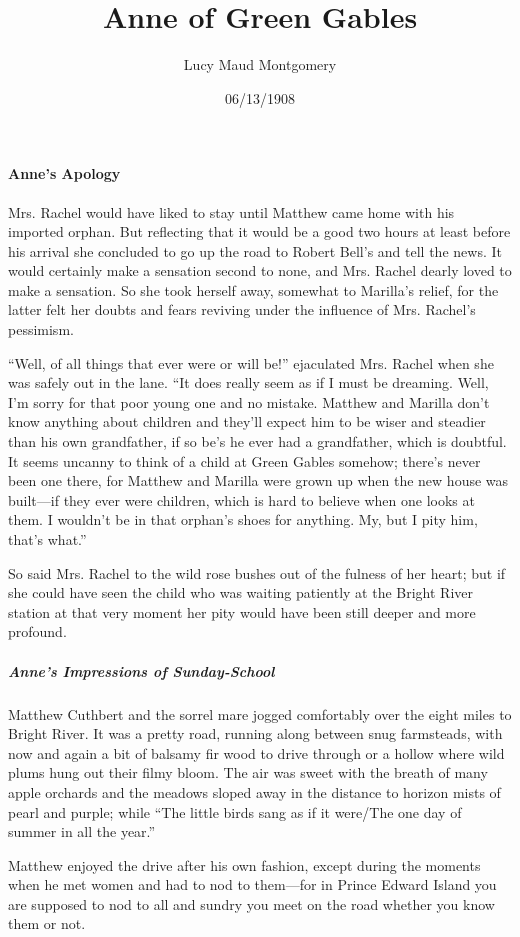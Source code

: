 \documentclass{article}
\title{Anne of Green Gables}
\author{Lucy Maud Montgomery}
\date{06/13/1908}
\begin{document}
\maketitle

\paragraph{Anne's Apology}
Mrs. Rachel would have liked to stay until Matthew came home with his imported orphan. But reflecting that it would be a good two hours at least before his arrival she concluded to go up the road to Robert Bell's and tell the news. It would certainly make a sensation second to none, and Mrs. Rachel dearly loved to make a sensation. So she took herself away, somewhat to Marilla's relief, for the latter felt her doubts and fears reviving under the influence of Mrs. Rachel's pessimism.

``Well, of all things that ever were or will be!'' ejaculated Mrs. Rachel when she was safely out in the lane. ``It does really seem as if I must be dreaming. Well, I'm sorry for that poor young one and no mistake. Matthew and Marilla don't know anything about children and they'll expect him to be wiser and steadier than his own grandfather, if so be's he ever had a grandfather, which is doubtful. It seems uncanny to think of a child at Green Gables somehow; there's never been one there, for Matthew and Marilla were grown up when the new house was built---if they ever were children, which is hard to believe when one looks at them. I wouldn't be in that orphan's shoes for anything. My, but I pity him, that's what.''

So said Mrs. Rachel to the wild rose bushes out of the fulness of her heart; but if she could have seen the child who was waiting patiently at the Bright River station at that very moment her pity would have been still deeper and more profound.

\subparagraph{Anne's Impressions of Sunday-School}
Matthew Cuthbert and the sorrel mare jogged comfortably over the eight miles to Bright River. It was a pretty road, running along between snug farmsteads, with now and again a bit of balsamy fir wood to drive through or a hollow where wild plums hung out their filmy bloom. The air was sweet with the breath of many apple orchards and the meadows sloped away in the distance to horizon mists of pearl and purple; while ``The little birds sang as if it were/The one day of summer in all the year.''

Matthew enjoyed the drive after his own fashion, except during the moments when he met women and had to nod to them---for in Prince Edward Island you are supposed to nod to all and sundry you meet on the road whether you know them or not.
\end{document}
